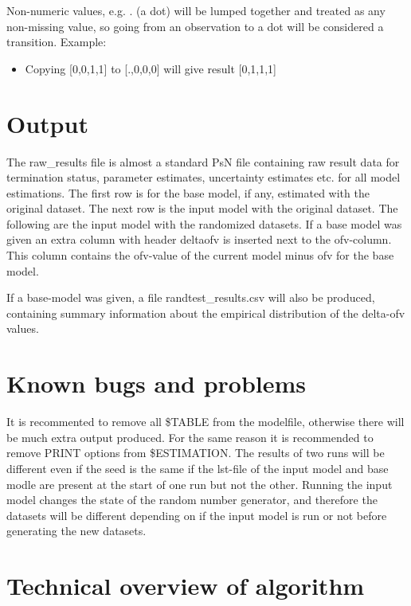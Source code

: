 \noindent Non-numeric values, e.g. . (a dot) will be lumped together and treated as any non-missing value, so going from an observation to a dot will be considered a transition. Example:
\begin{itemize}
\item Copying [0,0,1,1] to  [.,0,0,0] will give result [0,1,1,1] 
\end{itemize}

\section{Output}

The raw\_results file is almost a standard PsN file containing raw result data for termination status, parameter estimates, uncertainty estimates etc. for all model estimations. The first row is for the base model, if any, estimated with the original dataset. The next row is the input model with the original dataset. The following are the input model with the randomized datasets. If a base model was given an extra column with header deltaofv is inserted next to the ofv-column. This column contains the ofv-value of the current model minus ofv for the base model.

If a base-model was given, a file randtest\_results.csv will also be produced, 
containing summary information about the empirical distribution of the
delta-ofv values.


\section{Known bugs and problems}

It is recommented to remove all \$TABLE from the modelfile, otherwise there will be much extra output produced. For the same reason it is recommended to remove PRINT options from \$ESTIMATION. 
The results of two runs will be different even if the seed is the same if the lst-file of the input model and base modle are present at the start of one run but not the other. Running the input model changes the state of the random number generator, and therefore the datasets will be different depending on if the input model is run or not before generating the  new datasets.

\section{Technical overview of algorithm}

